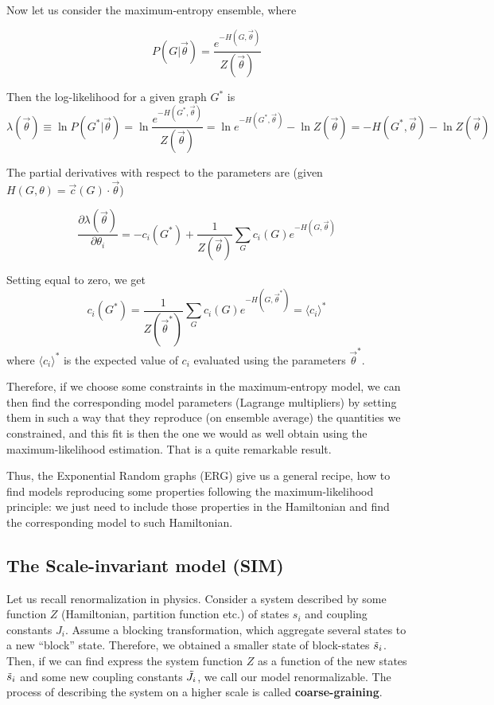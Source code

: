 Now let us consider the maximum-entropy ensemble, where 

\begin{equation*}
    P(G|\vec{\theta}) = \frac{e^{-H(G,\vec{\theta})}}{Z(\vec{\theta})}
\end{equation*}

Then the log-likelihood for a given graph $G^*$ is
\begin{equation*}
\lambda(\vec{\theta}) \equiv \ln P(G^*|\vec{\theta}) = \ln\frac{e^{-H(G^*,\vec{\theta})}}{Z(\vec{\theta})} = \ln e^{-H(G^*,\vec{\theta})} - \ln Z(\vec{\theta}) = -H(G^*,\vec{\theta}) - \ln Z(\vec{\theta})
\end{equation*}

The partial derivatives with respect to the parameters are (given $H(G,\theta) = \vec{c}(G)\cdot\vec{\theta}$)

\begin{equation*}
\frac{\partial \lambda(\vec{\theta})}{\partial \theta_i} = -c_i (G^*) + \frac{1}{Z(\vec{\theta})} \sum_{G}{c_i (G) e^{-H(G,\vec{\theta})}}
\end{equation*}

Setting equal to zero, we get
\begin{equation*}
    c_i (G^{*}) = \frac{1}{Z(\vec{\theta}^{*})} \sum_{G}{c_i (G) e^{-H(G,\vec{\theta}^{*})}} = \langle c_i \rangle ^*
\end{equation*}
where $\langle c_i \rangle ^*$ is the expected value of $c_i$ evaluated using the parameters $\vec{\theta}^{*}$.

Therefore, if we choose some constraints in the maximum-entropy model, we can then find the corresponding model parameters (Lagrange multipliers) by setting them in such a way that they reproduce (on ensemble average) the quantities we constrained, and this fit is then the one we would as well obtain using the maximum-likelihood estimation. That is a quite remarkable result. 

Thus, the Exponential Random graphs (ERG) give us a general recipe, how to find models reproducing some properties following the maximum-likelihood principle: we just need to include those properties in the Hamiltonian and find the corresponding model to such Hamiltonian.
 
\subsection{The Scale-invariant model (SIM)}
Let us recall renormalization in physics. Consider a system described by some function $Z$ (Hamiltonian, partition function etc.) of states $s_i$ and coupling constants $J_i$. Assume a blocking transformation, which aggregate several states to a new ``block'' state. Therefore, we obtained a smaller state of block-states $\Tilde{s}_i$. Then, if we can find express the system function $Z$ as a function of the new states $\Tilde{s}_i$ and some new coupling constants $\Tilde{J}_i$, we call our model renormalizable. The process of describing the system on a higher scale is called \textbf{coarse-graining}.

